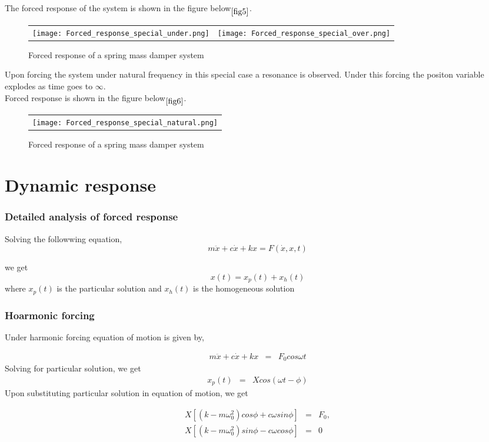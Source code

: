 \documentclass[10pt]{beamer}
\begin{document}
\begin{frame}
The forced response of the system is shown in the figure below$\phantom{}_{\ref{fig5}}$.

\begin{figure}[h]
	\begin{tabular} {l c}
	\texttt{[image: Forced\_response\_special\_under.png]} &
	\texttt{[image: Forced\_response\_special\_over.png]} 
	\end{tabular}
	\caption{Forced response of a spring mass damper system}
\end{figure}
\label{fig8}

\end{frame}
 
\begin{frame}

Upon forcing the system under natural frequency in this special case a resonance is observed. Under this
forcing the positon variable explodes as time goes to $\infty$.\\
Forced response is shown in the figure below$\phantom{}_{\ref{fig6}}$.

\begin{figure}[h]
	\begin{tabular} {l}
	\texttt{[image: Forced\_response\_special\_natural.png]} 
	\end{tabular}
	\caption{Forced response of a spring mass damper system}
\end{figure}
\label{fig9} 

\end{frame}

\section{Dynamic response}

\begin{frame}
\frametitle{Detailed analysis of forced response}
Solving the followwing equation,
$$ m\ddot{x} + c\dot{x} + kx = F(\dot{x},x,t) $$

we get 
$$ x(t) = x_p(t) + x_h(t)$$
where $x_p(t)$ is the particular solution and $x_h(t)$ is the homogeneous solution

\end{frame}

\begin{frame}
\frametitle{Hoarmonic forcing}
Under harmonic forcing equation of motion is given by,

\begin{eqnarray}
m\ddot{x} + c\dot{x} + kx &=& F_0cos\omega t
\end{eqnarray}
Solving for particular solution, we get
\begin{eqnarray}
x_p(t) &=& Xcos(\omega t - \phi)
\end{eqnarray}
Upon substituting particular solution in equation of motion, we get

\begin{eqnarray}
X[(k - m\omega_0^2)cos\phi + c\omega sin\phi] &=& F_0, \\ 
X[(k - m\omega_0^2)sin\phi - c\omega cos\phi] &=& 0 
\end{eqnarray}

\end{frame}
\end{document}
